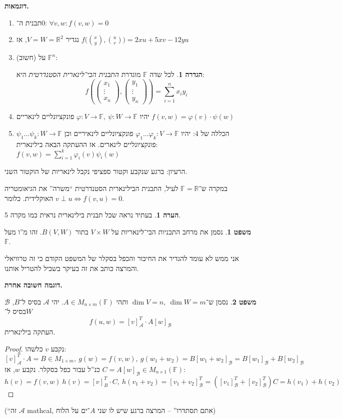 \documentclass[a4paper]{article}
\newcommand\R     {\mathbb{R}}
\newcommand\ac    {\mathcal{A}}
\newcommand\bc    {\mathcal{B}}
\newcommand\F         {\mathbb{F}}
\newcommand\co        {\colon}
\newcommand\pms[1]    {\begin{pmatrix}
		#1
\end{pmatrix}}
\newcommand\cl [1]    {\left ( #1 \right )}
\renewcommand\phi     {\varphi}
\theoremstyle{definition}
\newtheorem{Theorem}{משפט}
\newtheorem{definition}{הגדרה}
\newtheorem{Remark}{הערה}
\newcommand\theo  [1] {\begin{Theorem}#1\end{Theorem}}
\newcommand\defi  [1] {\begin{definition}#1\end{definition}}
\newcommand\rmark [1] {\begin{Remark}#1\end{Remark}}
\begin{document}
	\textbf{דוגמאות. }
	\begin{enumerate}
		\item תבנית ה־$0$: \hfill $\forall v,w \co f(v, w) = 0$ 
		\item נגדיר $V = W = \R^2$, אז \hfill $f\big(\binom{x}{y}, \binom{u}{v}\big) = 2xu + 5xv - 12yu$
		\item (חשוב)  על $\F^n$: \defi{לכל שדה $\F$ מוגדרת \textit{התבנית הבי־לינארית הסטנדרטית} היא: 
			\[ f\cl{\pms{x_1 \\ \vdots \\ x_n}, \pms{y_1 \\ \vdots \\ y_n}} = \sum_{i = 1}^{n}x_iy_i \]}
		\item יהיו $\phi \co V \to \F, \ \psi \co W \to \F$ פונקציונליים לינאריים \hfill $f(v, w) = \phi(v) \cdot \psi(w)$
		\item הכללה של 4: יהיו $\phi_1 \dots \phi_k \co V \to \F$ פונקציונליים לינאיריים וכן $\psi_1 \dots \psi_k \co W \to \F$ פונקציונליים לינארים. אז ההעתקה הבאה בילינארית: \hfill $f(v, w) = \sum_{i = 1}^{k}\phi_i(v) \psi_i(w)$
	\end{enumerate}
	הרעיון: ברגע שנקבע וקטור ספציפי נקבל לינאריות של הוקטור השני. 
	
	במקרה ש־$\F = \R$ לעיל, התבנית הבילינארית הסטנדרטית ``משרה'' את הגיאומטריה האוקלידית. כלומר $v \perp u \iff f(v, u) = 0$. 
	
	\rmark{בעתיד נראה שכל תבנית בילינארית נראית כמו מקרה 5. }
	
	\theo{נסמן את מרחב התבניות הבי־לינאריות על $V \times W$ בתור $B(V, W)$. זהו מ''ו מעל $\F$. }
	אני ממש לא עומד להגדיר את החיבור והכפל בסקלר של המשפט הקודם כי זה טרוויאלי והמרצה כותב את זה בעיקר בשביל להטריל אותנו. 
	
	\textbf{דוגמה חשובה אחרת. }\theo{נסמן ש־$\dim V = n, \ \dim W = m$ ותהי $A \in M_{n \times m}(\F)$. יהי $\ac$ בסיס ל־$B$, $\bc$ בסיס ל־$W$ \[ f(u, w) = [v]_\ac^T \cdot A[w]_{\bc} \] העתקה בילינארית. }
	\begin{proof}
		נקבע $v$ כלשהו: 
		\[ [v]_\ac^T \cdot A = B \in M_{1 \times m}, \ g(w) = f(v, w), \ g(w_1 + w_2) = B[w_1 + w_2]_\bc = B[w_1]_\bc + B[w_2]_\bc \]
		כנ''ל עבור כפל בסקלר. 
		נקבע $w$, אז $C = A[w]_\bc \in M_{n \times 1}(\F)$: 
		\[ h(v) = f(v, w) \ h(v) = [v]_B^T \cdot C, \ h(v_1 + v_2) = [v_1 + v_2]_\bc^T = ([v_1]_\bc^T + [v_2]_\bc^T)C = h(v_1) + h(v_2) \]
	\end{proof}
	(``זה $\ac$ mathcal, אתם תסתדרו'' – המרצה ברגע שיש לו שני $A$־ים על הלוח)
	
\end{document}
